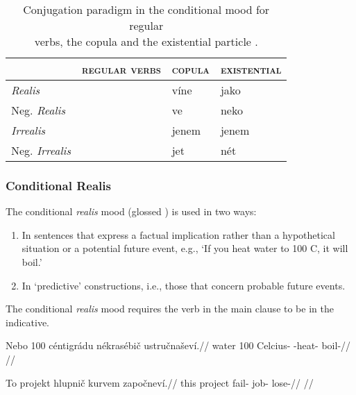 \begin{table}[h!]
	\footnotesize\sffamily
	\caption{Conjugation paradigm in the conditional mood for regular \\verbs, the copula and the existential particle .}
	\begin{tabu} to 0.8 \textwidth	{Y[1.3]Y[1.3]YY}
		\toprule
		&{\scshape regular verbs} & {\scshape copula} & {\scshape existential}\\
		\midrule

		\textit{Realis} 				& &v\'ine & jako\\
		Neg. \textit{Realis}		&&ve&neko\\

		\textit{Irrealis} 			& & jenem & jenem\\
		Neg. \textit{Irrealis} 	& & jet & n\'et\\
		\bottomrule
	\end{tabu}
\end{table}

\subsubsection{Conditional Realis}

\par The conditional \textit{realis} mood (glossed ) is used in two ways:
\begin{enumerate}
	\item In sentences that express a factual implication rather than a hypothetical situation or a potential future event, e.g., `If you heat water to 100 C, it will boil.'
	\item In `predictive' constructions, i.e., those that concern probable future events.
\end{enumerate}

The conditional \emph{realis} mood requires the verb in the main clause to be in the indicative.


\pex
\begingl
\gla Nebo 100 c\'entigr\'adu n\'ekras\'ebi\v{c} ustru\v{c}na\v{s}ev\'i.//
\glb water 100 Celcius- -heat- boil-//
\glft {}//
\endgl
\xe

\pex
\begingl
\gla To projekt hlupni\v{c} kurvem zapo\v{c}nev\'i.//
\glb this project fail- job- lose-//
\glft {}//
\endgl
\xe

